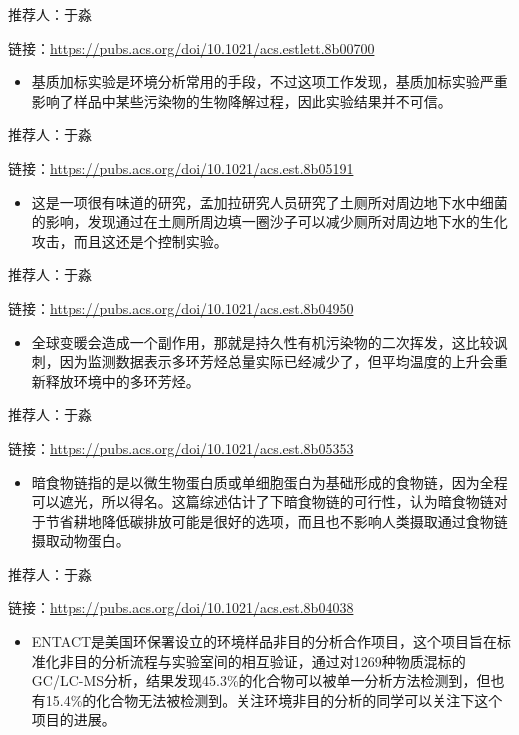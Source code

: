 \documentclass[]{book}
\providecommand{\tightlist}{%
  \setlength{\itemsep}{0pt}\setlength{\parskip}{0pt}}
\begin{document}
推荐人：于淼

链接：\url{https://pubs.acs.org/doi/10.1021/acs.estlett.8b00700}

\begin{itemize}
\tightlist
\item
  基质加标实验是环境分析常用的手段，不过这项工作发现，基质加标实验严重影响了样品中某些污染物的生物降解过程，因此实验结果并不可信。
\end{itemize}

推荐人：于淼

链接：\url{https://pubs.acs.org/doi/10.1021/acs.est.8b05191}

\begin{itemize}
\tightlist
\item
  这是一项很有味道的研究，孟加拉研究人员研究了土厕所对周边地下水中细菌的影响，发现通过在土厕所周边填一圈沙子可以减少厕所对周边地下水的生化攻击，而且这还是个控制实验。
\end{itemize}

推荐人：于淼

链接：\url{https://pubs.acs.org/doi/10.1021/acs.est.8b04950}

\begin{itemize}
\tightlist
\item
  全球变暖会造成一个副作用，那就是持久性有机污染物的二次挥发，这比较讽刺，因为监测数据表示多环芳烃总量实际已经减少了，但平均温度的上升会重新释放环境中的多环芳烃。
\end{itemize}

推荐人：于淼

链接：\url{https://pubs.acs.org/doi/10.1021/acs.est.8b05353}

\begin{itemize}
\tightlist
\item
  暗食物链指的是以微生物蛋白质或单细胞蛋白为基础形成的食物链，因为全程可以遮光，所以得名。这篇综述估计了下暗食物链的可行性，认为暗食物链对于节省耕地降低碳排放可能是很好的选项，而且也不影响人类摄取通过食物链摄取动物蛋白。
\end{itemize}

推荐人：于淼

链接：\url{https://pubs.acs.org/doi/10.1021/acs.est.8b04038}

\begin{itemize}
\tightlist
\item
  ENTACT是美国环保署设立的环境样品非目的分析合作项目，这个项目旨在标准化非目的分析流程与实验室间的相互验证，通过对1269种物质混标的GC/LC-MS分析，结果发现45.3\%的化合物可以被单一分析方法检测到，但也有15.4\%的化合物无法被检测到。关注环境非目的分析的同学可以关注下这个项目的进展。
\end{itemize}
\end{document}

